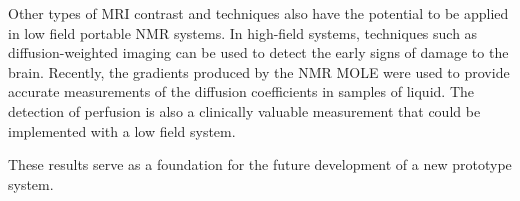 Other types of MRI contrast and techniques also have the potential to be applied in low field portable NMR systems.
In high-field systems, techniques such as diffusion-weighted imaging can be used to detect the early signs of damage to the brain.
Recently, the gradients produced by the NMR MOLE were used to provide accurate measurements of the diffusion coefficients in samples of liquid.
The detection of perfusion is also a clinically valuable measurement that could be implemented with a low field system.

These results serve as a foundation for the future development of a new prototype system.
